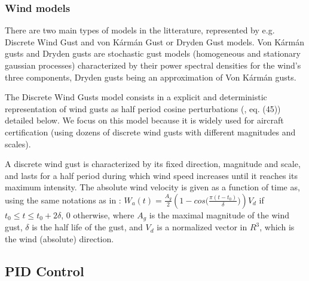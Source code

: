 \documentclass[anonymous=true,format=sigconf, screen=true, review=false]{acmart}
\begin{document}
\subsubsection{Wind models}

There are two main types of models in the litterature, represented by e.g. Discrete Wind Gust and von K\'arm\'an Gust or Dryden Gust models. Von K\'arm\'an gusts and Dryden gusts are stochastic gust models (homogeneous and stationary gaussian processes) characterized by their power spectral densities for the wind's three components, Dryden gusts being an approximation of Von K\'arm\'an gusts. 

The Discrete Wind Gusts model consists in a explicit and deterministic representation of wind gusts as half period cosine perturbations (\cite{demourant1}, eq. (45)) detailed below.
We focus on this model because it is widely used for aircraft certification (using dozens of discrete wind gusts with different magnitudes and scales). 

A discrete wind gust is characterized by its fixed direction, magnitude and scale, and lasts for a half period during which wind speed increases until it reaches its maximum intensity. The absolute wind velocity is given as a function of time as, using the same notations as in :
$W_a(t) =
  \frac{A_g}{2} \left(1 - cos\big(\frac{\pi (t-t_0)}{\delta}\big)\right) V_d$ if $  t_0 \leq t \leq t_0+2\delta$, 0 otherwise, 
where $A_g$ is the maximal magnitude of the wind gust, $\delta$ is the half life of the gust, and $V_d$ is a normalized vector in $R^3$, which is the wind (absolute) direction. 
        
 
\subsection{PID Control}
\end{document}
